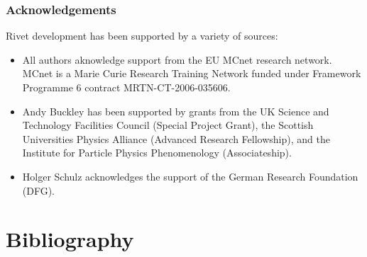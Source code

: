\documentclass{JHEP3}
\begin{document}
\section{Acknowledgements}
\label{app:acknowledgements}

Rivet development has been supported by a variety of sources:

\begin{itemize}
\item All authors aknowledge support from the EU MCnet research network. MCnet
  is a Marie Curie Research Training Network funded under Framework Programme 6
  contract MRTN-CT-2006-035606.
\item Andy Buckley has been supported by grants from the UK Science and
  Technology Facilities Council (Special Project Grant), the Scottish
  Universities Physics Alliance (Advanced Research Fellowship), and the
  Institute for Particle Physics Phenomenology (Associateship).
\item Holger Schulz acknowledges the support of the German Research Foundation (DFG).
\end{itemize}


\cleardoublepage
\part{Bibliography}

{\raggedright
  
}
\end{document}
